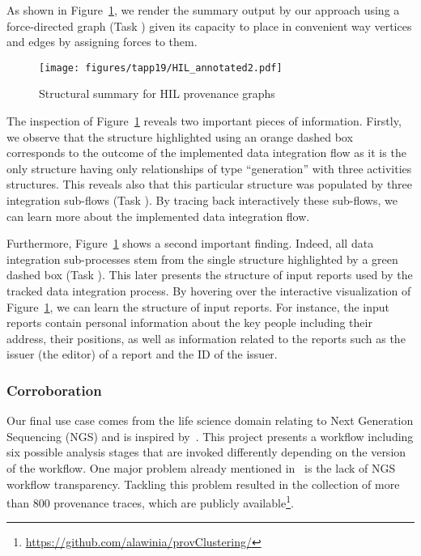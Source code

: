  

As shown in Figure~\ref{fig:IBM}, we render the summary output by our approach using a force-directed graph (Task ) given its capacity to place in convenient way vertices and edges by assigning forces to them.



\begin{figure}[t]
 \texttt{[image: figures/tapp19/HIL\_annotated2.pdf]}
 \caption{Structural summary for HIL provenance graphs}
 \label{fig:IBM}
\end{figure}
The inspection of Figure~\ref{fig:IBM} reveals two important pieces of information. Firstly, we observe that the structure highlighted using an orange dashed box corresponds to the outcome of the implemented data integration flow as it is the only structure having only relationships of type ``generation'' with three activities structures. This reveals also that this particular structure was populated by three integration sub-flows (Task ). By tracing back interactively these sub-flows, we can learn more about the implemented data integration flow.


Furthermore, Figure~\ref{fig:IBM} shows a second important finding. Indeed, all data integration sub-processes stem from the single structure highlighted by a green dashed box (Task ). This later presents the structure of input reports used by the tracked data integration process. 
By hovering over the interactive visualization of Figure~\ref{fig:IBM}, 
we can learn the structure of input reports.
For instance, the input reports contain personal information about the key people including their address, their positions, as well as information related to the reports such as the issuer (the editor) of a report and the ID of the issuer.






\subsubsection{Corroboration}
Our final use case comes from the life science domain relating to Next Generation Sequencing (NGS) and is inspired by~\cite{alawini:18}. 
This project presents a workflow including six possible analysis stages that are invoked differently depending on the version of the workflow. 
One major problem already mentioned in~\cite{alawini:18} is the lack of NGS workflow transparency. Tackling this problem resulted in the collection of more than 800 provenance traces, which are publicly available\footnote{\url{https://github.com/alawinia/provClustering/}}. 

